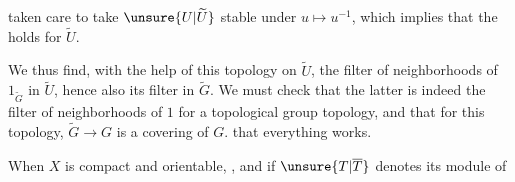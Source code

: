  taken care to take $\unsure{U|\widetilde U}$ stable under $u\mapsto u^{-1}$, which implies that the  holds for $\widetilde U$.

We thus find, with the help of this topology on $\widetilde U$,  the filter of neighborhoods of $1_{\widetilde G}$ in $\widetilde U$, hence also its  filter in $\widetilde G$. We must check that the latter is indeed the filter of neighborhoods of $1$ for a topological group topology, and that for this topology, $\widetilde G\to G$ is a covering of $G$.  that everything works.

When $X$ is  compact and orientable, , and  if $\unsure{T|\overline T}$ denotes its module of




